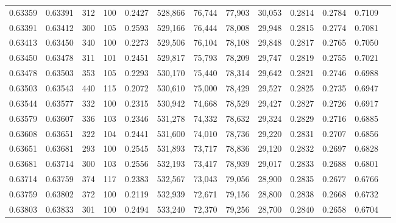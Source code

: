 \begin{tabular}{rrrrrrrrrrrrr}
0.63359 & 0.63391 &   312 & 100 &                                     0.2427 & 528,866 &  76,744 &  77,903 &  30,053 & 0.2814 & 0.2784 & 0.7109 \\
0.63391 & 0.63412 &   300 & 105 &                                     0.2593 & 529,166 &  76,444 &  78,008 &  29,948 & 0.2815 & 0.2774 & 0.7081 \\
0.63413 & 0.63450 &   340 & 100 &                                     0.2273 & 529,506 &  76,104 &  78,108 &  29,848 & 0.2817 & 0.2765 & 0.7050 \\
0.63450 & 0.63478 &   311 & 101 &                                     0.2451 & 529,817 &  75,793 &  78,209 &  29,747 & 0.2819 & 0.2755 & 0.7021 \\
0.63478 & 0.63503 &   353 & 105 &                                     0.2293 & 530,170 &  75,440 &  78,314 &  29,642 & 0.2821 & 0.2746 & 0.6988 \\
0.63503 & 0.63543 &   440 & 115 &                                     0.2072 & 530,610 &  75,000 &  78,429 &  29,527 & 0.2825 & 0.2735 & 0.6947 \\
0.63544 & 0.63577 &   332 & 100 &                                     0.2315 & 530,942 &  74,668 &  78,529 &  29,427 & 0.2827 & 0.2726 & 0.6917 \\
0.63579 & 0.63607 &   336 & 103 &                                     0.2346 & 531,278 &  74,332 &  78,632 &  29,324 & 0.2829 & 0.2716 & 0.6885 \\
0.63608 & 0.63651 &   322 & 104 &                                     0.2441 & 531,600 &  74,010 &  78,736 &  29,220 & 0.2831 & 0.2707 & 0.6856 \\
0.63651 & 0.63681 &   293 & 100 &                                     0.2545 & 531,893 &  73,717 &  78,836 &  29,120 & 0.2832 & 0.2697 & 0.6828 \\
0.63681 & 0.63714 &   300 & 103 &                                     0.2556 & 532,193 &  73,417 &  78,939 &  29,017 & 0.2833 & 0.2688 & 0.6801 \\
0.63714 & 0.63759 &   374 & 117 &                                     0.2383 & 532,567 &  73,043 &  79,056 &  28,900 & 0.2835 & 0.2677 & 0.6766 \\
0.63759 & 0.63802 &   372 & 100 &                                     0.2119 & 532,939 &  72,671 &  79,156 &  28,800 & 0.2838 & 0.2668 & 0.6732 \\
0.63803 & 0.63833 &   301 & 100 &                                     0.2494 & 533,240 &  72,370 &  79,256 &  28,700 & 0.2840 & 0.2658 & 0.6704 \\

\end{tabular}
